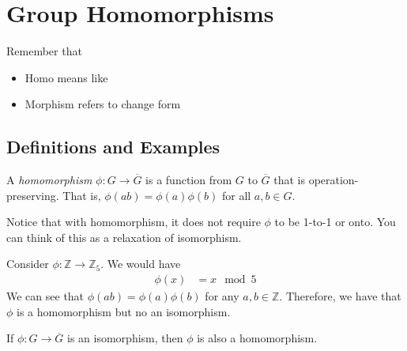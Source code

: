 \chapter{Group Homomorphisms}

Remember that
\begin{itemize}
    \item Homo means like
    \item Morphism refers to change form
\end{itemize}

\section{Definitions and Examples}

\begin{definition}[Homomorphism]
    A \textit{homomorphism} \(\phi : G \to \overline{G}\) is a function from \(G\) to \(\overline{G}\) that is operation-preserving. That is, \(\phi(ab) = \phi(a)\phi(b)\) for all \(a, b \in G\).
\end{definition}

Notice that with homomorphism, it does not require \(\phi\) to be 1-to-1 or onto. You can think of this as a relaxation of isomorphism.

\begin{nexample}
    Consider \(\phi: \mathbb{Z} \to \mathbb{Z}_5\). We would have
    \[
    \begin{aligned}
        \phi(x) &= x \mod 5
    \end{aligned}
    \]
    We can see that \(\phi(ab) = \phi(a)\phi(b)\) for any \(a, b \in \mathbb{Z}\). Therefore, we have that \(\phi\) is a homomorphism but no an isomorphism.
\end{nexample}

\begin{remark}
    If \(\phi : G \to \overline{G}\) is an isomorphism, then \(\phi\) is also a homomorphism.
\end{remark}

